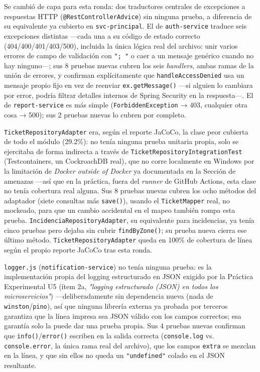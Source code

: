 Se cambió de capa para esta ronda: dos traductores centrales de excepciones a respuestas HTTP
(\texttt{@RestControllerAdvice}) sin ninguna prueba, a diferencia de su equivalente ya cubierto
en \texttt{svc-principal}. El de \texttt{auth-service} traduce seis excepciones distintas —cada
una a su código de estado correcto (404/400/401/403/500), incluida la única lógica real del
archivo: unir varios errores de campo de validación con \texttt{"; "} o caer a un mensaje
genérico cuando no hay ninguno—; sus 8 pruebas nuevas cubren los seis \emph{handlers}, ambas
ramas de la unión de errores, y confirman explícitamente que \texttt{handleAccessDenied} usa un
mensaje propio fijo en vez de reenviar \texttt{ex.getMessage()} —si alguien lo cambiara por
error, podría filtrar detalles internos de Spring Security en la respuesta—. El de
\texttt{report-service} es más simple (\texttt{ForbiddenException} → 403, cualquier otra cosa →
500); sus 2 pruebas nuevas lo cubren por completo.

\texttt{TicketRepositoryAdapter} era, según el reporte JaCoCo, la clase peor cubierta de todo el
módulo (29.2\%): no tenía ninguna prueba unitaria propia, solo se ejercitaba de forma indirecta
a través de \texttt{TicketRepositoryIntegrationTest} (Testcontainers, un CockroachDB real), que
no corre localmente en Windows por la limitación de \emph{Docker outside of Docker} ya
documentada en la Sección de amenazas —así que en la práctica, fuera del \emph{runner} de GitHub
Actions, esta clase no tenía cobertura real alguna. Sus 8 pruebas nuevas cubren los ocho métodos
del adaptador (siete consultas más \texttt{save()}), usando el \texttt{TicketMapper} real, no
mockeado, para que un cambio accidental en el mapeo también rompa esta prueba.
\texttt{IncidenciaRepositoryAdapter}, su equivalente para incidencias, ya tenía cinco pruebas
pero dejaba sin cubrir \texttt{findByZone()}; su prueba nueva cierra ese último método.
\texttt{TicketRepositoryAdapter} queda en 100\% de cobertura de línea según el propio reporte
JaCoCo tras esta ronda.

\texttt{logger.js} (\texttt{notification-service}) no tenía ninguna prueba: es la
implementación propia del logging estructurado en JSON exigido por la Práctica Experimental U5
(ítem 2a, \emph{"logging estructurado (JSON) en todos los microservicios"}) —deliberadamente sin
dependencia nueva (nada de \texttt{winston}/\texttt{pino}), así que ninguna librería externa ya
probada por terceros garantiza que la línea impresa sea JSON válido con los campos correctos; esa
garantía solo la puede dar una prueba propia. Sus 4 pruebas nuevas confirman que
\texttt{info()}/\texttt{error()} escriben en la salida correcta (\texttt{console.log} vs.
\texttt{console.error}, la única rama real del archivo), que los campos \texttt{extra} se
mezclan en la línea, y que sin ellos no queda un \texttt{"undefined"} colado en el JSON
resultante.

